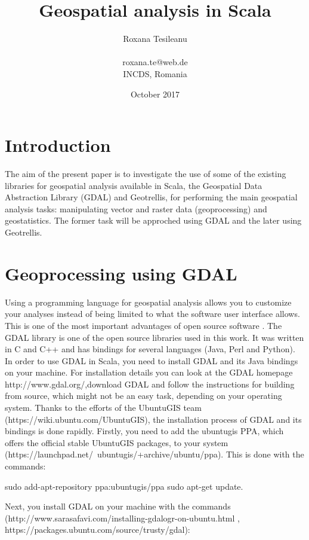 \documentclass {article}
\title {Geospatial analysis in Scala}
\date {October 2017}
\author {Roxana Tesileanu \\
\\
roxana.te@web.de \\
INCDS, Romania}
\begin{document}
	\maketitle

\tableofcontents

\section {Introduction}

The aim of the present paper is to investigate the use of some of the existing libraries for geospatial analysis available in Scala, the Geospatial Data Abstraction Library (GDAL) and Geotrellis, for performing the main geospatial analysis tasks: manipulating vector and raster data (geoprocessing) and geostatistics.
The former task will be approched using GDAL and the later using Geotrellis.  

\section {Geoprocessing using GDAL}

Using a programming language for geospatial analysis allows you to customize your analyses instead of being limited to what the software user interface allows. This is one of the most important advantages of open source software \cite{garrard_geoprocessing_2016}. The GDAL library is one of the open source libraries used in this work. It was written in C and C++ and has bindings for several languages (Java, Perl and Python).     
In order to use GDAL in Scala, you need to install GDAL and its Java bindings on your machine.  
For installation details you can look at the GDAL homepage http://www.gdal.org/,download GDAL and follow the instructions for building from source, which might not be an easy task, depending on your operating system. Thanks to the efforts of the UbuntuGIS team (https://wiki.ubuntu.com/UbuntuGIS), the installation process of GDAL and its bindings is done rapidly. Firstly, you need to add the ubuntugis PPA, which offers the official stable UbuntuGIS packages, to your system (https://launchpad.net/~ubuntugis/+archive/ubuntu/ppa). This is done with the commands:

sudo add-apt-repository ppa:ubuntugis/ppa
sudo apt-get update.

Next, you install GDAL on your machine with the commands (http://www.sarasafavi.com/installing-gdalogr-on-ubuntu.html , https://packages.ubuntu.com/source/trusty/gdal):
\end{document}
